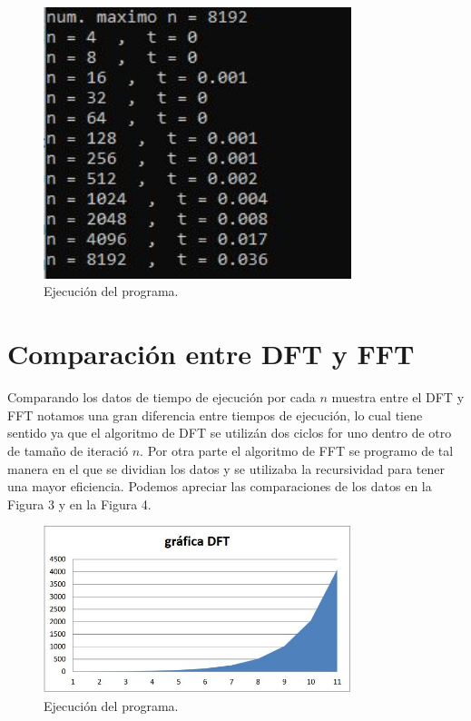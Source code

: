 \documentclass[12pt,letterpaper]{article}
\begin{document}
\begin{figure}[ht!]
  \centering
  \includegraphics[width=0.8\textwidth]{FFT}
  \caption{Ejecución del programa.}
  \label{fig:FFT}
\end{figure}

\newpage

\section{Comparaci\'on entre DFT y FFT}
Comparando los datos de tiempo de ejecuci\'on por cada $n$ muestra entre el DFT y FFT notamos una gran diferencia entre tiempos de ejecuci\'on, lo cual tiene sentido ya que el algoritmo de DFT se utiliz\'an dos ciclos for uno dentro de otro de tamaño de iteraci\'o $n$. Por otra parte el algoritmo de FFT se programo de tal manera en el que se dividian los datos y se utilizaba la recursividad para tener una mayor eficiencia. Podemos apreciar las comparaciones de los datos en la Figura 3 y en la Figura 4.

\begin{figure}[ht!]
  \centering
  \includegraphics[width=0.8\textwidth]{imgDFT}
  \caption{Ejecución del programa.}
  \label{fig:FFT_1d}
\end{figure}
\end{document}
